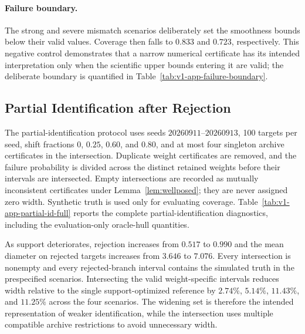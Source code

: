 \documentclass[11pt]{article}
\numberwithin{equation}{section}
\newcommand{\1}{\mathbf 1}
\begin{document}


\paragraph{Failure boundary.}
The strong and severe mismatch scenarios deliberately set the smoothness bounds below their valid values.  Coverage then falls to $0.833$ and $0.723$, respectively.  This negative control demonstrates that a narrow numerical certificate has its intended interpretation only when the scientific upper bounds entering it are valid; the deliberate boundary is quantified in Table~\ref{tab:v1-app-failure-boundary}.




\subsection{Partial Identification after Rejection}
\label{app:partial-identification}
\suppressfloats[t]

The partial-identification protocol uses seeds $20260911$--$20260913$, 100 targets per seed, shift fractions $0$, $0.25$, $0.60$, and $0.80$, and at most four singleton archive certificates in the intersection.  Duplicate weight certificates are removed, and the failure probability is divided across the distinct retained weights before their intervals are intersected.  Empty intersections are recorded as mutually inconsistent certificates under Lemma~\ref{lem:wellposed}; they are never assigned zero width.  Synthetic truth is used only for evaluating coverage. Table~\ref{tab:v1-app-partial-id-full} reports the complete partial-identification diagnostics, including the evaluation-only oracle-hull quantities.



As support deteriorates, rejection increases from $0.517$ to $0.990$ and the mean diameter on rejected targets increases from $3.646$ to $7.076$.  Every intersection is nonempty and every rejected-branch interval contains the simulated truth in the prespecified scenarios.  Intersecting the valid weight-specific intervals reduces width relative to the single support-optimized reference by $2.74\%$, $5.14\%$, $11.43\%$, and $11.25\%$ across the four scenarios.  The widening set is therefore the intended representation of weaker identification, while the intersection uses multiple compatible archive restrictions to avoid unnecessary width.
\end{document}
